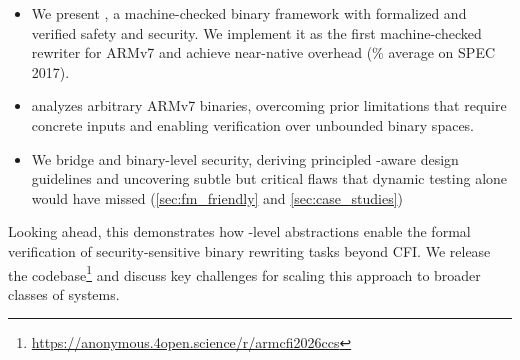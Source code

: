 \begin{itemize}[topsep=0pt,itemsep=-1ex,partopsep=1ex,parsep=1ex, leftmargin=*]
  \item  We present \pname, a machine-checked binary \cfi framework with formalized and verified safety and security. We implement it as the first machine-checked \cfi rewriter for ARMv7 and achieve near-native overhead (\avgoh\% average on SPEC 2017).

  \item \pname analyzes arbitrary ARMv7 binaries, overcoming prior \FM limitations that require concrete inputs and enabling verification over unbounded binary spaces.

  \item  We bridge \FM and binary-level security, deriving principled \FM-aware design guidelines and uncovering subtle but critical flaws that dynamic testing alone would have missed (\autoref{sec:fm_friendly} and \autoref{sec:case_studies})
\end{itemize}

Looking ahead, this demonstrates how \isa-level abstractions enable the formal verification of security-sensitive binary rewriting tasks beyond CFI. We release the \pname codebase\footnote{\label{note0}\url{https://anonymous.4open.science/r/armcfi2026ccs}} and discuss key challenges for scaling this approach to broader classes of systems.



